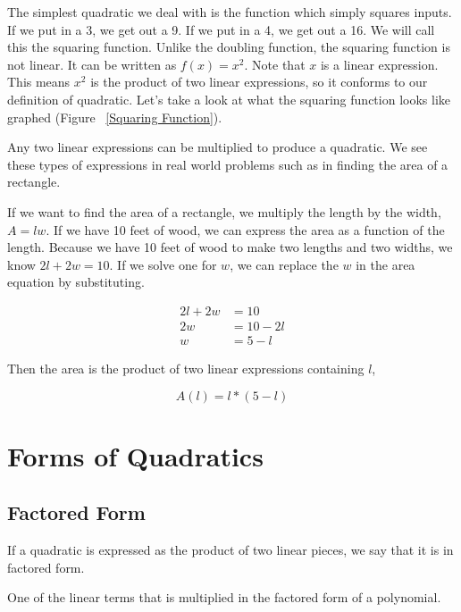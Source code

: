 The simplest quadratic we deal with is the function which simply squares inputs.  If we put in a 3, we get out a 9.  If we put in a 4, we get out a 16.  We will call this the squaring function.  Unlike the doubling function, the squaring function is not linear.  It can be written as $f(x) = x^2$.  Note that $x$ is a linear expression.  This means $x^2$ is the product of two linear expressions, so it conforms to our definition of quadratic. Let's take a look at what the squaring function looks like graphed (Figure ~\ref{Squaring Function}).

Any two linear expressions can be multiplied to produce a quadratic. We see these types of expressions in real world problems such as in finding the area of a rectangle.




\newpage
\begin{example}
If we want to find the area of a rectangle, we multiply the length by the width, $A = lw$.  If we have 10 feet of wood, we can express the area as a function of the length.  Because we have 10 feet of wood to make two lengths and two widths, we know $2l + 2w = 10$.   If we solve one for $w$, we can replace the $w$ in the area equation by substituting.

$$\begin{array}{rl}
2l + 2w & = 10\\
2w & = 10 - 2l\\
w & = 5 - l\end{array}$$

Then the area is the product of two linear expressions containing $l$, 

$$A(l) = l*(5 - l)$$
\end{example}

\section*{Forms of Quadratics}

\subsection*{Factored Form}

If a quadratic is expressed as the product of two linear pieces, we say that it is in factored form.

\begin{defn}[Factor]

One of the linear terms that is multiplied in the factored form of a polynomial.
\end{defn}


